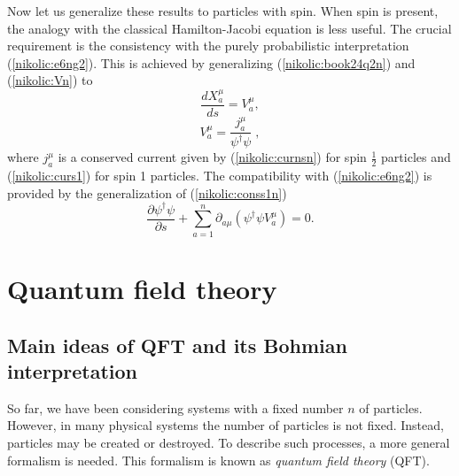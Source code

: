 \documentclass[12pt,twoside]{report} %
\begin{document}
Now let us generalize these results to particles with spin. When spin is present,
the analogy with the classical Hamilton-Jacobi equation is less useful. The crucial
requirement is the consistency with the purely probabilistic interpretation (\ref{nikolic:e6ng2}).
This is achieved by generalizing (\ref{nikolic:book24q2n}) and (\ref{nikolic:Vn}) to
\begin{equation}\label{nikolic:book24q2ns}
 \frac{dX_a^{\mu}}{ds}=V_a^{\mu} ,
\end{equation}
\begin{equation}\label{nikolic:Vns}
V_a^{\mu}=\frac{j_a^{\mu}}{\psi^{\dagger}\psi} \; ,
\end{equation}
where $j_a^{\mu}$ is a conserved current given by (\ref{nikolic:curnsn}) for
spin $\frac{1}{2}$ particles and (\ref{nikolic:curs1}) for spin 1 particles. 
The compatibility with (\ref{nikolic:e6ng2}) is provided by the generalization of (\ref{nikolic:conss1n})
\begin{equation}\label{nikolic:conss1ns}
\frac{\partial\psi^{\dagger}\psi}{\partial s} + 
\sum_{a=1}^{n}\partial_{a\mu}(\psi^{\dagger}\psi V_a^{\mu})=0 .
\end{equation}



\section{Quantum field theory} 

\subsection{Main ideas of QFT and its Bohmian interpretation}
\label{nikolic:SEC2}

So far, we have been considering systems with a fixed number $n$ of particles.
However, in many physical systems the number of particles is not fixed.
Instead, particles may be created or destroyed. To describe such processes,
a more general formalism is needed. This formalism is known as
{\it quantum field theory} (QFT).
\end{document}
